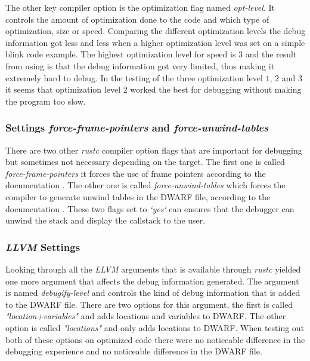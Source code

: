 The other key compiler option is the optimization flag named \emph{opt-level}.
It controls the amount of optimization done to the code and which type of optimization, size or speed.
Comparing the different optimization levels the debug information got less and less when a higher optimization level was set on a simple blink code example.
The highest optimization level for speed is $3$ and the result from using is that the debug information got very limited, thus making it extremely hard to debug.
In the testing of the three optimization level $1$, $2$ and $3$ it seems that optimization level $2$ worked the best for debugging without making the program too slow.


\subsubsection{Settings \emph{force-frame-pointers} and \emph{force-unwind-tables}}
There are two other \emph{rustc} compiler option flags that are important for debugging but sometimes not necessary depending on the target.
The first one is called \emph{force-frame-pointers} it forces the use of frame pointers according to the documentation \cite{rustc-book-codegen}.
The other one is called \emph{force-unwind-tables} which forces the compiler to generate unwind tables in the \gls{DWARF} file, according to the documentation \cite{rustc-book-codegen}.
These two flags set to \emph{`yes`} can ensures that the debugger can unwind the stack and display the callstack to the user.


\subsubsection{\emph{LLVM} Settings}
Looking through all the \emph{LLVM} arguments that is available through \emph{rustc} yielded one more argument that affects the debug information generated.
The argument is named \emph{debugify-level} and controls the kind of debug information that is added to the \gls{DWARF} file.
There are two options for this argument, the first is called \emph{"location+variables"} and adds locations and variables to \gls{DWARF}.
The other option is called \emph{"locations"} and only adds locations to \gls{DWARF}.
When testing out both of these options on optimized code there were no noticeable difference in the debugging experience and no noticeable difference in the  \gls{DWARF} file.


